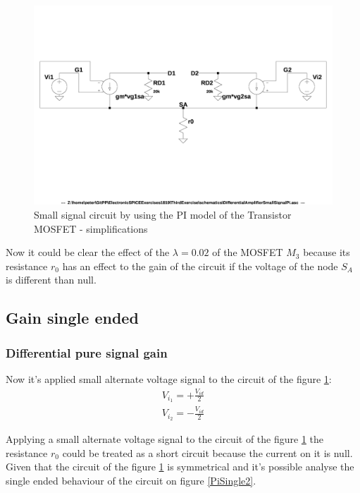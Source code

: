 \documentclass[10pt,a4paper]{book}
\begin{document}
\begin{figure}[h]
  \centering
  \includegraphics[width=12cm]{schematics/DifferentialAmplifierSmallSignalPi.jpg}
  \caption{Small signal circuit by using the PI model of the Transistor MOSFET - simplifications}
  \label{PiSimple}
\end{figure}

Now it could be clear the effect of the $\lambda = 0.02$ of the MOSFET $M_3$ because its resistance $r_0$ has an effect to the gain of the circuit if the voltage of the node $S_A$ is different than null.\par

\subsection{Gain single ended}
\subsubsection{Differential pure signal gain}
Now it's applied  small alternate voltage signal to the circuit of the figure \ref{PiSimple}:\\
\begin{align}
V_{i_1} =+ \frac{V_{id}}{2} \label{Vi1d}\\
V_{i_2} =- \frac{V_{id}}{2} \label{Vi2d}
\end{align}


Applying a small alternate voltage signal to the circuit of the figure \ref{PiSimple} the resistance $r_0$ could be treated as a short circuit because the current on it is null.\\
Given that the circuit of the figure \ref{PiSimple} is symmetrical and it's possible analyse the single ended behaviour of the circuit on figure \ref{PiSingle2}.\par
\end{document}
